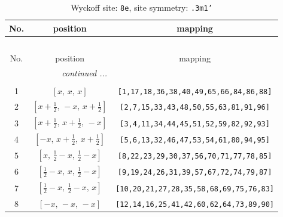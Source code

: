 \documentclass[fleqn,8pt]{jsarticle}
\begin{document}
\begin{longtable}{ccc}
\caption{Wyckoff site: {\tt 8e}, site symmetry: {\tt .3m1'}}
 \\
 \hline \hline
No. & position & mapping \\ \hline \endfirsthead

\multicolumn{2}{l}{\tablename\ \thetable{}} \\
 \hline \hline
No. & position & mapping \\ \hline \endhead

 \hline \hline
\multicolumn{2}{r}{\footnotesize\it continued ...} \\ \endfoot

 \hline \hline
\multicolumn{2}{r}{} \\ \endlastfoot

1 & $\left[ x,\, x,\, x \right]$ & {\tt [1,17,18,36,38,40,49,65,66,84,86,88]} \\ \hline
2 & $\left[ x + \frac{1}{2},\, - x,\, x + \frac{1}{2} \right]$ & {\tt [2,7,15,33,43,48,50,55,63,81,91,96]} \\ \hline
3 & $\left[ x + \frac{1}{2},\, x + \frac{1}{2},\, - x \right]$ & {\tt [3,4,11,34,44,45,51,52,59,82,92,93]} \\ \hline
4 & $\left[ - x,\, x + \frac{1}{2},\, x + \frac{1}{2} \right]$ & {\tt [5,6,13,32,46,47,53,54,61,80,94,95]} \\ \hline
5 & $\left[ x,\, \frac{1}{2} - x,\, \frac{1}{2} - x \right]$ & {\tt [8,22,23,29,30,37,56,70,71,77,78,85]} \\ \hline
6 & $\left[ \frac{1}{2} - x,\, x,\, \frac{1}{2} - x \right]$ & {\tt [9,19,24,26,31,39,57,67,72,74,79,87]} \\ \hline
7 & $\left[ \frac{1}{2} - x,\, \frac{1}{2} - x,\, x \right]$ & {\tt [10,20,21,27,28,35,58,68,69,75,76,83]} \\ \hline
8 & $\left[ - x,\, - x,\, - x \right]$ & {\tt [12,14,16,25,41,42,60,62,64,73,89,90]} \\
\end{longtable}
\renewcommand{\arraystretch}{1.2}
\end{document}
